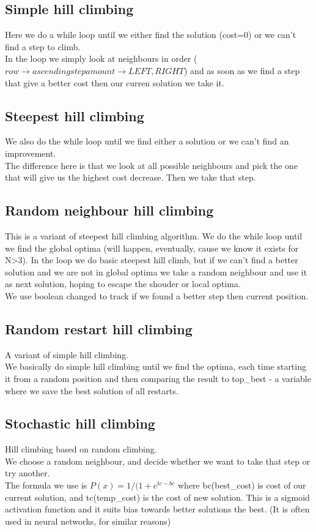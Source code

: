 \documentclass[10pt,a4paper]{article}
\begin{document}
		\subsection{Simple hill climbing}
			Here we do a while loop until we either find the solution (cost=0) or we can't find a step to climb. \\
			In the loop we simply look at neighbours in order ($row \rightarrow ascending step amount \rightarrow LEFT,RIGHT$) and as soon as we find a step that give a better cost then our curren solution we take it.
		\subsection{Steepest hill climbing}
			We also do the while loop until we find either a solution or we can't find an improvement. \\
			The difference here is that we look at all possible neighbours and pick the one that will give us the highest cost decrease. Then we take that step.
		\subsection{Random neighbour hill climbing}
			This is a variant of steepest hill climbing algorithm.
			We do the while loop until we find the global optima (will happen, eventually, cause we know it exists for N>3).
			In the loop we do basic steepest hill climb, but if we can't find a better solution and we are not in global optima we take a random neighbour and use it as next solution, hoping to escape the shouder or local optima.\\
			We use boolean changed to track if we found a better step then current position.
		\subsection{Random restart hill climbing}
			A variant of simple hill climbing. \\
			We basically do simple hill climbing until we find the optima, each time starting it from a random position and then comparing the result to top\_best - a variable where we save the best solution of all restarts.\
		\subsection{Stochastic hill climbing}
			Hill climbing based on random climbing. \\
			We choose a random neighbour, and decide whether we want to take that step or try another. \\
			The formula we use is $P(x)=1/(1+e^{tc-bc}$ where bc(best\_cost) is cost of our current solution, and tc(temp\_cost) is the cost of new solution. This is a sigmoid activation function and it suits bias towards better solutions the best. (It is often used in neural networks, for similar reasons)
\end{document}
